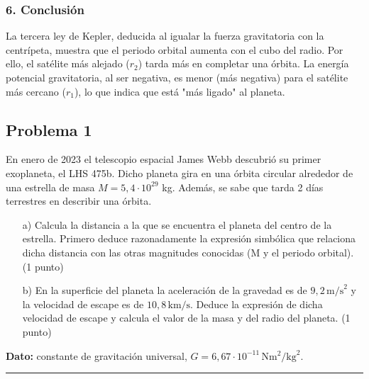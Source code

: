 \subsubsection*{6. Conclusión}
\begin{cajaconclusion}
La tercera ley de Kepler, deducida al igualar la fuerza gravitatoria con la centrípeta, muestra que el periodo orbital aumenta con el cubo del radio. Por ello, el satélite más alejado ($r_2$) tarda más en completar una órbita. La energía potencial gravitatoria, al ser negativa, es menor (más negativa) para el satélite más cercano ($r_1$), lo que indica que está "más ligado" al planeta.
\end{cajaconclusion}

\newpage

\subsection{Problema 1}
\label{subsec:P1_2023_jul_ord}

\begin{cajaenunciado}
En enero de 2023 el telescopio espacial James Webb descubrió su primer exoplaneta, el LHS 475b. Dicho planeta gira en una órbita circular alrededor de una estrella de masa $M=5,4\cdot10^{29}$ kg. Además, se sabe que tarda 2 días terrestres en describir una órbita.
\begin{enumerate}
    \item[a)] Calcula la distancia a la que se encuentra el planeta del centro de la estrella. Primero deduce razonadamente la expresión simbólica que relaciona dicha distancia con las otras magnitudes conocidas (M y el periodo orbital). (1 punto)
    \item[b)] En la superficie del planeta la aceleración de la gravedad es de $9,2\,\text{m/s}^2$ y la velocidad de escape es de $10,8\,\text{km/s}$. Deduce la expresión de dicha velocidad de escape y calcula el valor de la masa y del radio del planeta. (1 punto)
\end{enumerate}
\textbf{Dato:} constante de gravitación universal, $G=6,67\cdot10^{-11}\,\text{N}\text{m}^2/\text{kg}^2$.
\end{cajaenunciado}
\hrule

